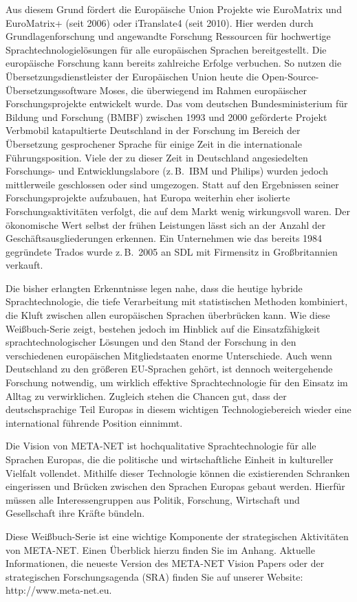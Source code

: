 \documentclass[]{../../metanetpaper}
\begin{document}
\begin{multicols}{2}
Aus diesem Grund fördert die Europäische Union Projekte wie EuroMatrix und EuroMatrix+ (seit 2006) oder iTranslate4 (seit 2010). Hier werden durch Grundlagenforschung und angewandte Forschung Ressourcen für hochwertige Sprachtechnologielösungen für alle europäischen Sprachen bereitgestellt. Die europäische Forschung kann bereits zahlreiche Erfolge verbuchen. So nutzen die Übersetzungsdienstleister der Europäischen Union heute die Open-Source-Über\-set\-zungs\-soft\-ware Moses, die überwiegend im Rahmen europäischer Forschungsprojekte entwickelt wurde. Das vom deutschen Bundesministerium für Bildung und Forschung (BMBF) zwischen 1993 und 2000 geförderte Projekt Verbmobil katapultierte Deutschland in der Forschung im Bereich der Übersetzung gesprochener Sprache für einige Zeit in die internationale Führungsposition. Viele der zu dieser Zeit in Deutschland angesiedelten Forschungs- und Entwicklungslabore (z.\,B.~IBM und Philips) wurden jedoch mittlerweile geschlossen oder sind umgezogen. Statt auf den Ergebnissen seiner Forschungsprojekte aufzubauen, hat Europa weiterhin eher isolierte Forschungsaktivitäten verfolgt, die auf dem Markt wenig wirkungsvoll waren. Der ökonomische Wert selbst der frühen Leistungen lässt sich an der Anzahl der Geschäftsausgliederungen erkennen. Ein Unternehmen wie das bereits 1984 gegründete Trados wurde z.\,B.~2005 an SDL mit Firmensitz in Großbritannien verkauft.


Die bisher erlangten Erkenntnisse legen nahe, dass die heutige hybride Sprachtechnologie, die tiefe Verarbeitung mit statistischen Methoden kombiniert, die Kluft zwischen allen europäischen Sprachen überbrücken kann. Wie diese Weiß\-buch-Se\-rie zeigt, bestehen jedoch im Hinblick auf die Einsatzfähigkeit sprachtechnologischer Lösungen und den Stand der Forschung in den verschiedenen europäischen Mitgliedstaaten enorme Unterschiede. Auch wenn Deutschland zu den größeren EU-Sprachen gehört, ist dennoch weitergehende Forschung notwendig, um wirklich effektive Sprachtechnologie für den Einsatz im Alltag zu verwirklichen. Zugleich stehen die Chancen gut, dass der deutschsprachige Teil Europas in diesem wichtigen Technologiebereich wieder eine international führende Position einnimmt.

Die Vision von META-NET ist hochqualitative Sprachtechnologie für alle Sprachen Europas, die die politische und wirtschaftliche Einheit in kultureller Vielfalt vollendet. Mithilfe dieser Technologie können die existierenden Schranken eingerissen und Brücken zwischen den Sprachen Europas gebaut werden. Hierfür müssen alle Interessengruppen aus Politik, Forschung, Wirtschaft und Gesellschaft ihre Kräfte bündeln.

Diese Weißbuch-Serie ist eine wichtige Komponente der strategischen Aktivitäten von META-NET. Einen Überblick hierzu finden Sie im Anhang. Aktuelle Informationen, die neueste Version des META-NET Vision Papers \cite{Meta1} oder der strategischen Forschungsagenda (SRA) finden Sie auf unserer Website: http://www.meta-net.eu.  \end{multicols}
\end{document}
